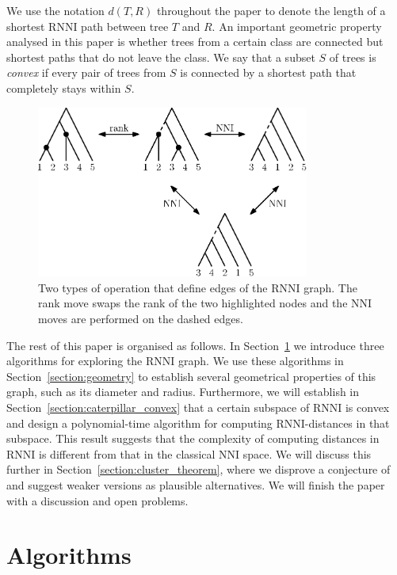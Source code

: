 \documentclass{amsart}
\newcommand{\nni}{\mathrm{NNI}}
\newcommand{\rnni}{\mathrm{RNNI}}
\begin{document}
We use the notation $d(T, R)$ throughout the paper to denote the length of a shortest $\rnni$ path between tree $T$ and $R$.
An important geometric property analysed in this paper is whether trees from a certain class are connected but shortest paths that do not leave the class.
We say that a subset $S$ of trees is \emph{convex} if every pair of trees from $S$ is connected by a shortest path that completely stays within $S$.

\begin{figure}[H]
\centering
\includegraphics[width=0.8\textwidth]{RNNI}
\vspace{12pt}
\caption{Two types of operation that define edges of the $\rnni$ graph.
The rank move swaps the rank of the two highlighted nodes and the $\nni$ moves are performed on the dashed edges.}
\label{fig:RNNI}
\end{figure}

The rest of this paper is organised as follows.
In Section~\ref{section:algorithms} we introduce three algorithms for exploring the $\rnni$ graph.
We use these algorithms in Section~\ref{section:geometry} to establish several geometrical properties of this graph, such as its diameter and radius.
Furthermore, we will establish in Section~\ref{section:caterpillar_convex} that a certain subspace of $\rnni$ is convex and design a polynomial-time algorithm for computing $\rnni$-distances in that subspace.
This result suggests that the complexity of computing distances in $\rnni$ is different from that in the classical $\nni$ space.
We will discuss this further in Section~\ref{section:cluster_theorem}, where we disprove a conjecture of \textcite{Gavryushkin2018-ol} and suggest weaker versions as plausible alternatives.
We will finish the paper with a discussion and open problems.


\section{Algorithms}
\label{section:algorithms}
\end{document}

